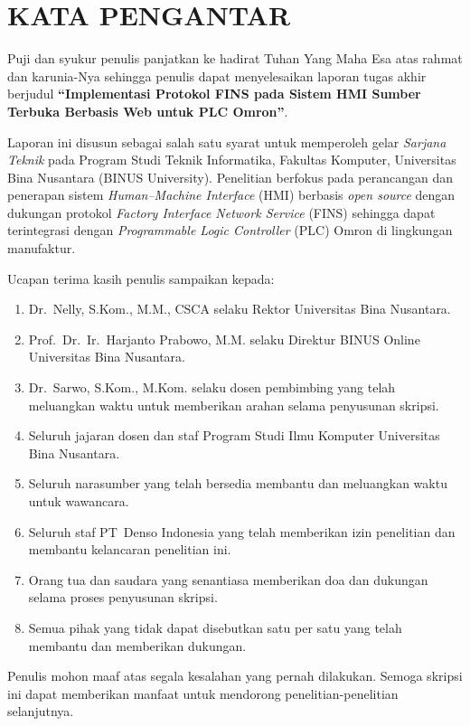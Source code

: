 \chapter*{KATA PENGANTAR}

Puji dan syukur penulis panjatkan ke hadirat Tuhan Yang Maha Esa atas rahmat dan karunia-Nya sehingga penulis dapat menyelesaikan laporan tugas akhir berjudul \textbf{``Implementasi Protokol FINS pada Sistem HMI Sumber Terbuka Berbasis Web untuk PLC Omron''}.

Laporan ini disusun sebagai salah satu syarat untuk memperoleh gelar \textit{Sarjana Teknik} pada Program Studi Teknik Informatika, Fakultas Komputer, Universitas Bina Nusantara (BINUS University). Penelitian berfokus pada perancangan dan penerapan sistem \textit{Human–Machine Interface} (HMI) berbasis \textit{open source} dengan dukungan protokol \textit{Factory Interface Network Service} (FINS) sehingga dapat terintegrasi dengan \textit{Programmable Logic Controller} (PLC) Omron di lingkungan manufaktur.

Ucapan terima kasih penulis sampaikan kepada:
\begin{enumerate}
    \item Dr.~Nelly, S.Kom., M.M., CSCA selaku Rektor Universitas Bina Nusantara.
    \item Prof.~Dr.~Ir.~Harjanto Prabowo, M.M. selaku Direktur BINUS Online Universitas Bina Nusantara.
    \item Dr.~Sarwo, S.Kom., M.Kom. selaku dosen pembimbing yang telah meluangkan waktu untuk memberikan arahan selama penyusunan skripsi.
    \item Seluruh jajaran dosen dan staf Program Studi Ilmu Komputer Universitas Bina Nusantara.
    \item Seluruh narasumber yang telah bersedia membantu dan meluangkan waktu untuk wawancara.
    \item Seluruh staf PT~Denso Indonesia yang telah memberikan izin penelitian dan membantu kelancaran penelitian ini.
    \item Orang tua dan saudara yang senantiasa memberikan doa dan dukungan selama proses penyusunan skripsi.
    \item Semua pihak yang tidak dapat disebutkan satu per satu yang telah membantu dan memberikan dukungan.
\end{enumerate}

Penulis mohon maaf atas segala kesalahan yang pernah dilakukan. Semoga skripsi ini dapat memberikan manfaat untuk mendorong penelitian-penelitian selanjutnya.

